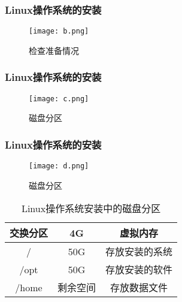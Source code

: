 \documentclass[notheorems,mathserif,table,compress]{beamer}  %
\begin{document}
\begin{frame}
  \frametitle{Linux操作系统的安装}
  \begin{figure}[!ht]
  \centering\texttt{[image: b.png]}
  \caption{检查准备情况}
  \label{fig:2}
  \end{figure}
\end{frame}

\begin{frame}
  \frametitle{Linux操作系统的安装}  
  \begin{figure}[!ht]
  \centering\texttt{[image: c.png]}
  \caption{磁盘分区}
  \label{fig:3}
  \end{figure}
\end{frame}

\begin{frame}
  \frametitle{Linux操作系统的安装}  
  \begin{figure}[!ht]
  \centering\texttt{[image: d.png]}
  \caption{磁盘分区}
  \label{fig:4}
  \end{figure}
\end{frame}

\begin{comment}
  \frametitle{Linux操作系统的安装}  
  \begin{itemize}
  \item 交换分区：4G
  \item / ：50G\\
        存放安装的系统
  \item /opt：50G\\
        存放安装的软件
  \item /home：剩余空间\\
        存放数据文件
  \end{itemize}
\end{comment}

\begin{frame}

\begin{table}[!htp] %
\label{tab:1}
\centering
\begin{tabular}{|c|c|c|}
\hline
交换分区&4G&虚拟内存\\
\hline
/ &50G&存放安装的系统\\
\hline
/opt&50G&存放安装的软件\\
\hline
/home&剩余空间&存放数据文件\\
\hline
\end{tabular}  
\caption{Linux操作系统安装中的磁盘分区}
\end{table}

\end{frame}
\end{document}
